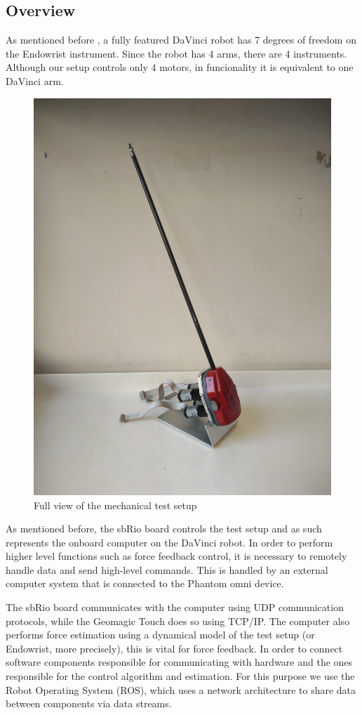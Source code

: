 \documentclass[conference]{IEEEtran}
\begin{document}
\subsection{Overview}
As mentioned before , a fully featured DaVinci robot  has 7 degrees of freedom on the Endowrist instrument.
Since the robot has 4 arms, there are 4 instruments.
Although our setup controls only 4 motors, in funcionality it is equivalent to one DaVinci arm. 

\begin{figure}
		\centering
		\includegraphics[width=0.4\linewidth]{Test_setup4.jpg}
		\caption{Full view of the mechanical test setup}
		\label{fig:Mec_d}
\end{figure}

As mentioned before, the sbRio board controls the test setup and as such represents the onboard computer on the DaVinci robot.
In order to perform higher level functions such as force feedback control, it is necessary to remotely handle data and send high-level commands.
This is handled by an external computer system that is connected to the Phantom omni device.

The sbRio board communicates with the computer using UDP  communication protocols, while the Geomagic Touch does so using TCP/IP.
The computer also performs force estimation using a dynamical model of the test setup (or Endowrist, more precisely), this is vital for force feedback.
In order to connect software components responsible for communicating with hardware and the ones responsible for the control algorithm and estimation.
For this purpose we use the Robot Operating System (ROS), which uses a network architecture to share data between components via data streams.
\end{document}
